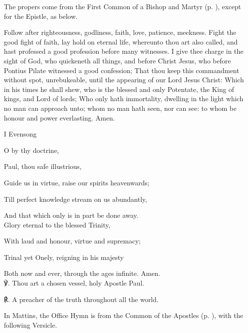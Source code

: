 \begin{rubric}
	The propers come from the First Common of a Bishop and Martyr (p. \pageref{CommonMartyrBishopI}), except for the Epistle, as below.
\end{rubric}

 Follow after righteousness, godliness, faith, love, patience, meekness. Fight the good fight of faith, lay hold on eternal life, whereunto thou art also called, and hast professed a good profession before many witnesses. I give thee charge in the sight of God, who quickeneth all things, and before Christ Jesus, who before Pontius Pilate witnessed a good confession; That thou keep this commandment without spot, unrebukeable, until the appearing of our Lord Jesus Christ: Which in his times he shall shew, who is the blessed and only Potentate, the King of kings, and Lord of lords; Who only hath immortality, dwelling in the light which no man can approach unto; whom no man hath seen, nor can see: to whom be honour and power everlasting. Amen.


\begin{inhead}
	I Evensong
\end{inhead}

O by thy doctrine,

Paul, thou safe illustrious,

Guide us in virtue, raise our spirits heavenwards;

Till perfect knowledge stream on us abundantly,

And that which only is in part be done away.\\

Glory eternal to the blessed Trinity,

With laud and honour, virtue and supremacy;

Trinal yet Onely, reigning in his majesty

Both now and ever, through the ages infinite. Amen.\\

℣. Thou art a chosen vessel, holy Apostle Paul.

℟. A preacher of the truth throughout all the world.\\

\begin{rubric}
	In Mattins, the Office Hymn is from the Common of the Apostles (p. \pageref{CommonApostles}), with the following Versicle.
\end{rubric}


